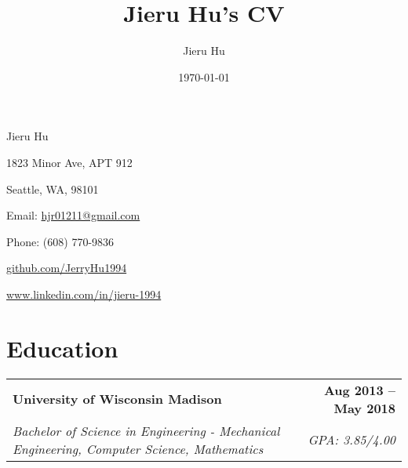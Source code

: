 \documentclass[a4paper,11pt]{article}
\makeatletter
\newcommand{\educationHeader}[4]{
  \vspace{-1pt}
    \begin{tabular*}{0.97\textwidth}{l@{\extracolsep{\fill}}r}
      \textbf{#1} & \textbf{#2} \\
      \textit{\small#3} & \textit{\small #4} \\
    \end{tabular*}\vspace{-5pt}
}
\newcommand{\courseWork}[3]{
  \vspace{-1pt}
    \begin{tabular*}{0.97\textwidth}{l@{\extracolsep{\fill}}r}
      \textit{\small #1}\\
    	  \textit{\small #2}\\
       \textit{\small #3}\\
    \end{tabular*}\vspace{-5pt}
}
\makeatother
\begin{document}
\title{Jieru Hu's CV}
\author{Jieru Hu}
\date{\today}

\begin{center}
{\Huge Jieru Hu}\par\bigskip
\begin{minipage}[b]{0.33333\textwidth}
\raggedright
1823 Minor Ave, APT 912 \par
Seattle, WA, 98101
\end{minipage}%
\begin{minipage}[b]{0.33333\textwidth}
\centering
Email: \href{mailto:hjr01211@gmail.com}{hjr01211@gmail.com}\par
Phone: (608) 770-9836
\end{minipage}%
\begin{minipage}[b]{0.33333\textwidth}
\raggedleft
\href{github.com/JerryHu1994}{github.com/JerryHu1994}\par
\href{www.linkedin.com/in/jieru-1994}{www.linkedin.com/in/jieru-1994}
\end{minipage}
\end{center}


\section{Education}
	\educationHeader
	{University of Wisconsin Madison}{Aug 2013 – May 2018}
	{Bachelor of Science in Engineering - Mechanical Engineering, Computer Science, Mathematics}{GPA: 3.85/4.00}


\end{document}

